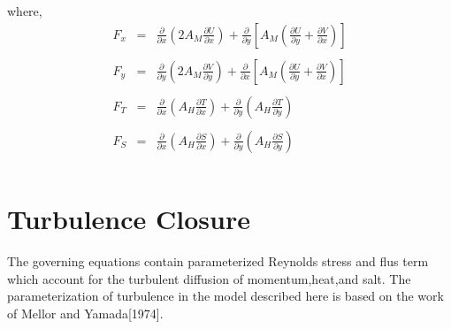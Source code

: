 \documentclass[oribibl]{llncs}
\begin{document}
where,
\begin{eqnarray*}
F_x &=&  \frac{\partial}{\partial x} \left ( 2A_M \frac{\partial U}{\partial x} \right ) + \frac{\partial}{\partial y} \left [ A_M \left ( \frac{\partial U}{\partial y} + \frac{\partial V}{\partial x} \right ) \right ] \\ \nonumber \\ 
F_y &=&  \frac{\partial}{\partial y} \left ( 2A_M \frac{\partial V}{\partial y} \right ) + \frac{\partial}{\partial x} \left [ A_M \left ( \frac{\partial U}{\partial y} + \frac{\partial V}{\partial x} \right ) \right ] \\ \nonumber \\ 
F_T &=&  \frac{\partial}{\partial x} \left ( A_H \frac{\partial T}{\partial x} \right ) + \frac{\partial}{\partial y} \left ( A_H \frac{\partial T}{\partial y} \right ) \\ \nonumber \\ 
F_S &=&  \frac{\partial}{\partial x} \left ( A_H \frac{\partial S}{\partial x} \right ) + \frac{\partial}{\partial y} \left ( A_H \frac{\partial S}{\partial y} \right ) \\ \nonumber \\ 
\end{eqnarray*}


\section{Turbulence Closure}

The governing equations contain parameterized Reynolds stress and flus term which account for the turbulent diffusion of momentum,heat,and salt. The parameterization of turbulence in the model described here is based on the work of Mellor and Yamada[1974].
\end{document}
